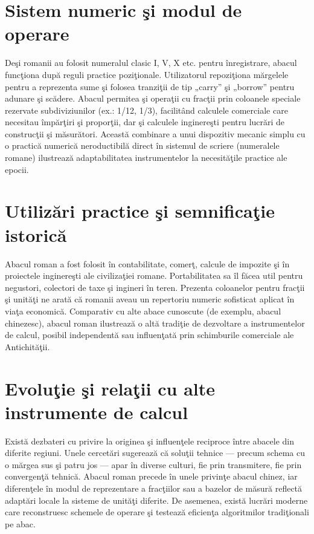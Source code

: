 \documentclass[11pt,a4paper]{article}
\begin{document}
\section*{Sistem numeric şi modul de operare}
Deşi romanii au folosit numeralul clasic I, V, X etc. pentru înregistrare, abacul funcţiona după reguli practice poziţionale. Utilizatorul repoziţiona mărgelele pentru a reprezenta sume şi folosea tranziţii de tip „carry” şi „borrow” pentru adunare şi scădere. Abacul permitea şi operaţii cu fracţii prin coloanele speciale rezervate subdiviziunilor (ex.: 1/12, 1/3), facilitând calculele comerciale care necesitau împărţiri şi proporţii, dar şi calculele inginereşti pentru lucrări de construcţii şi măsurători. Această combinare a unui dispozitiv mecanic simplu cu o practică numerică neroductibilă direct în sistemul de scriere (numeralele romane) ilustrează adaptabilitatea instrumentelor la necesităţile practice ale epocii.

\section*{Utilizări practice şi semnificaţie istorică}
Abacul roman a fost folosit în contabilitate, comerţ, calcule de impozite şi în proiectele inginereşti ale civilizaţiei romane. Portabilitatea sa îl făcea util pentru negustori, colectori de taxe şi ingineri în teren. Prezenta coloanelor pentru fracţii şi unităţi ne arată că romanii aveau un repertoriu numeric sofisticat aplicat în viaţa economică. Comparativ cu alte abace cunoscute (de exemplu, abacul chinezesc), abacul roman ilustrează o altă tradiţie de dezvoltare a instrumentelor de calcul, posibil independentă sau influenţată prin schimburile comerciale ale Antichităţii.

\section*{Evoluţie şi relaţii cu alte instrumente de calcul}
Există dezbateri cu privire la originea şi influenţele reciproce între abacele din diferite regiuni. Unele cercetări sugerează că soluţii tehnice — precum schema cu o mărgea sus şi patru jos — apar în diverse culturi, fie prin transmitere, fie prin convergenţă tehnică. Abacul roman precede în unele privinţe abacul chinez, iar diferenţele în modul de reprezentare a fracţiilor sau a bazelor de măsură reflectă adaptări locale la sisteme de unităţi diferite. De asemenea, există lucrări moderne care reconstruesc schemele de operare şi testează eficienţa algoritmilor tradiţionali pe abac.
\end{document}
